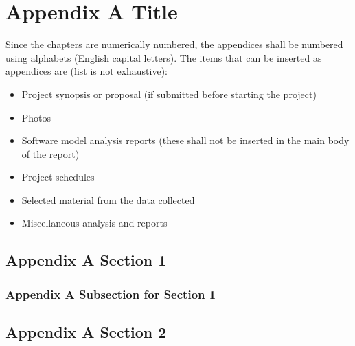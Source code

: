 
\chapter{Appendix A Title} %
\label{AppendixA} %

Since the chapters are numerically numbered, the appendices shall be numbered using alphabets (English capital letters). The items that can be inserted as appendices are (list is not exhaustive):

\begin{itemize}
	\item Project synopsis or proposal (if submitted before starting the project)
	\item Photos
	\item Software model analysis reports (these shall not be inserted in the main body of the report)
	\item Project schedules
	\item Selected material from the data collected
	\item Miscellaneous analysis and reports
\end{itemize}


\section{Appendix A Section 1}

\subsection{Appendix A Subsection for Section 1}

\section{Appendix A Section 2}
